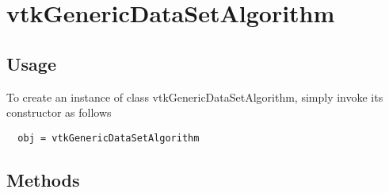 \section{vtkGenericDataSetAlgorithm}

\subsection{Usage}


To create an instance of class vtkGenericDataSetAlgorithm, simply
invoke its constructor as follows
\begin{verbatim}
  obj = vtkGenericDataSetAlgorithm
\end{verbatim}
\subsection{Methods}

